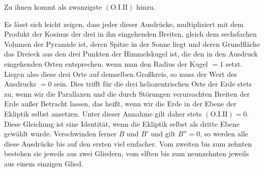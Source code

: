 Zu ihnen kommt als zwanzigste $(\mathrm{O}.\mathrm{I}.\mathrm{II})$ hinzu.
\par
Es lässt sich leicht zeigen, dass jeder dieser Ausdrücke, multipliziert mit dem Produkt der Kosinus der drei in ihn eingehenden Breiten, gleich dem sechsfachen Volumen der Pyramide ist, deren Spitze in der Sonne liegt und deren Grundfläche das Dreieck aus den drei Punkten der Himmelskugel ist, die den in den Ausdruck eingehenden Orten entsprechen, wenn man den Radius der Kugel $=1$ setzt. Liegen also diese drei Orte auf demselben Großkreis, so muss der Wert des Ausdrucks $=0$ sein. Dies trifft für die drei heliozentrischen Orte der Erde stets zu, wenn wir die Parallaxen und die durch Störungen verursachten Breiten der Erde außer Betracht lassen, das heißt, wenn wir die Erde in der Ebene der Ekliptik selbst ansetzen. Unter dieser Annahme gilt daher stets $(\mathrm{O}.\mathrm{I}.\mathrm{II})=0$. Diese Gleichung ist eine Identität, wenn die Ekliptik selbst als dritte Ebene gewählt wurde. Verschwinden ferner $B$ und $B'$ und gilt $B''=0$, so werden alle diese Ausdrücke bis auf den ersten viel einfacher. Vom zweiten bis zum zehnten bestehen sie jeweils aus zwei Gliedern, vom elften bis zum neunzehnten jeweils aus einem einzigen Glied.
